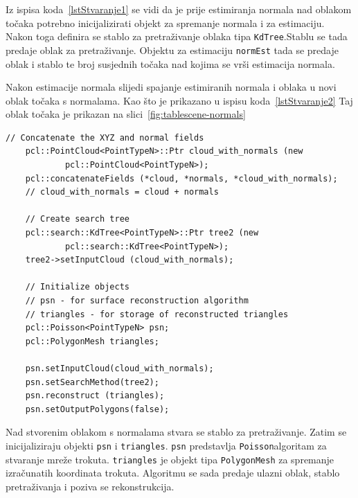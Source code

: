 Iz ispisa koda~\ref{lstStvaranje1} se vidi da je prije estimiranja
normala nad oblakom točaka potrebno inicijalizirati objekt za
spremanje normala i za estimaciju. Nakon toga definira se
stablo za pretraživanje oblaka tipa \texttt{KdTree}.\footnotemark[1]
Stablu se tada predaje oblak za pretraživanje. Objektu za
estimaciju \texttt{normEst} tada se predaje oblak i stablo te broj
susjednih točaka nad kojima se vrši estimacija
normala\footnotemark[2]. 


Nakon estimacije normala slijedi spajanje estimiranih normala i oblaka u
novi oblak točaka s normalama. Kao što je prikazano u ispisu
koda~\ref{lstStvaranje2} Taj oblak točaka je prikazan na 
slici~\ref{fig:tablescene-normals}

\newpage
\begin{lstlisting}[label=lstStvaranje2,caption={Dio izvornog koda za
    stvaranju mreže iz funkcije \texttt{reconstruct\_mesh()} }]
    // Concatenate the XYZ and normal fields
    pcl::PointCloud<PointTypeN>::Ptr cloud_with_normals (new
            pcl::PointCloud<PointTypeN>);
    pcl::concatenateFields (*cloud, *normals, *cloud_with_normals);
    // cloud_with_normals = cloud + normals

    // Create search tree 
    pcl::search::KdTree<PointTypeN>::Ptr tree2 (new
            pcl::search::KdTree<PointTypeN>);
    tree2->setInputCloud (cloud_with_normals);

    // Initialize objects 
    // psn - for surface reconstruction algorithm
    // triangles - for storage of reconstructed triangles
    pcl::Poisson<PointTypeN> psn;
    pcl::PolygonMesh triangles;

    psn.setInputCloud(cloud_with_normals);
    psn.setSearchMethod(tree2);
    psn.reconstruct (triangles);
    psn.setOutputPolygons(false);
\end{lstlisting}

Nad stvorenim oblakom s normalama stvara se stablo za pretraživanje.
Zatim se inicijaliziraju objekti \texttt{psn} i \texttt{triangles}.
\texttt{psn} predstavlja \texttt{Poisson}\footnotemark[1] algoritam za
stvaranje mreže trokuta. \texttt{triangles} je objekt tipa
\texttt{PolygonMesh} za spremanje izračunatih koordinata trokuta.
Algoritmu se sada predaje ulazni oblak, stablo pretraživanja i poziva se
rekonstrukcija.

